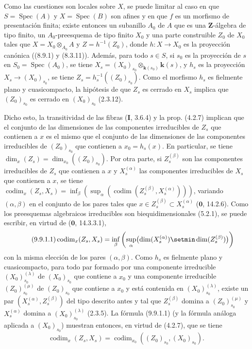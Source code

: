 Como las cuestiones son locales sobre $X$, se puede limitar al caso en que
$S=\operatorname{Spec}(A)$ y $X=\operatorname{Spec}(B)$ son afines y en que
$f$ es un morfismo de presentación finita; existe entonces un subanillo
$A_0$ de $A$ que es una $\mathbf Z$-álgebra de tipo finito, un
$A_0$-preesquema de tipo finito $X_0$ y una parte construible $Z_0$ de $X_0$
tales que $X=X_0\otimes_{A_0}A$ y $Z=h^{-1}(Z_0)$, donde $h:X\to X_0$ es la
proyección canónica ((8.9.1) y (8.3.11)). Además, para todo $s\in S$, si
$s_0$ es la proyección de $s$ en $S_0=\operatorname{Spec}(A_0)$, se tiene
$X_s=(X_0)_{s_0}\otimes_{\mathbf{k}(s_0)}\boldsymbol{k}(s)$,
y $h_s$ es la proyección $X_s\to(X_0)_{s_0}$, se tiene
$Z_s=h_s^{-1}((Z_0)_{s_0})$. Como el morfismo $h_s$ es fielmente plano y
cuasicompacto, la hipótesis de que $Z_s$ es cerrado en $X_s$ implica que
$(Z_0)_{s_0}$ es cerrado en $(X_0)_{s_0}$ (2.3.12).

Dicho esto, la transitividad de las fibras (\textbf{I}, 3.6.4) y la prop. (4.2.7)
implican que el conjunto de las dimensiones de las componentes irreducibles de
$Z_s$ que contienen a $x$ es el mismo que el conjunto de las dimensiones de las componentes
irreducibles de $(Z_0)_{s_0}$ que contienen a $x_0=h_s(x)$. En particular, se tiene
$\dim_x(Z_s)=\dim_{x_0}((Z_0)_{s_0})$. Por otra parte, si $Z_s^{(\beta)}$ son las
componentes irreducibles de $Z_s$ que contienen a $x$ y $X_s^{(\alpha)}$ las
componentes irreducibles de $X_s$
que contienen a $x$, se tiene $\operatorname{codim}_x(Z_s,X_s)=
\inf_\beta(\sup_\alpha
(\operatorname{codim}(Z_s^{(\beta)},X_s^{(\alpha)})))$,
variando $(\alpha,\beta)$ en el conjunto de los pares tales que
$x\in Z_s^{(\beta)}\subset X_s^{(\alpha)}$ ($\mathbf 0$, 14.2.6). Como los
preesquemas algebraicos irreducibles son biequidimensionales (5.2.1), se puede
escribir, en virtud de ($\mathbf 0$, 14.3.3.1),
\begin{equation}
\tag{9.9.1.1}
\label{IV.9.9.1.1-fr}
\operatorname{codim}_x(Z_s,X_s)=
\inf_\beta\left(\sup_\alpha
\bigl(\dim(X_s^{(\alpha)})\setmin\dim(Z_s^{(\beta)})\bigr)\right)
\end{equation}
con la misma elección de los pares $(\alpha,\beta)$. Como $h_s$ es fielmente
plano y cuasicompacto, para todo par formado por una componente irreducible
$(X_0)_{s_0}^{(\lambda)}$ de $(X_0)_{s_0}$ que contiene a $x_0$ y una componente
irreducible $(Z_0)_{s_0}^{(\mu)}$ de $(Z_0)_{s_0}$ que contiene a $x_0$ y está contenida
en $(X_0)_{s_0}^{(\lambda)}$, existe un par
$(X_s^{(\alpha)},Z_s^{(\beta)})$ del tipo descrito antes y tal que
$Z_s^{(\beta)}$ domina a $(Z_0)_{s_0}^{(\mu)}$ y $X_s^{(\alpha)}$ domina a
$(X_0)_{s_0}^{(\lambda)}$ (2.3.5). La fórmula (9.9.1.1) (y la fórmula análoga
aplicada a $(X_0)_{s_0}$) muestran entonces, en virtud de (4.2.7), que se tiene
\[
\operatorname{codim}_x(Z_s,X_s)=
\operatorname{codim}_{x_0}((Z_0)_{s_0},(X_0)_{s_0}).
\]

